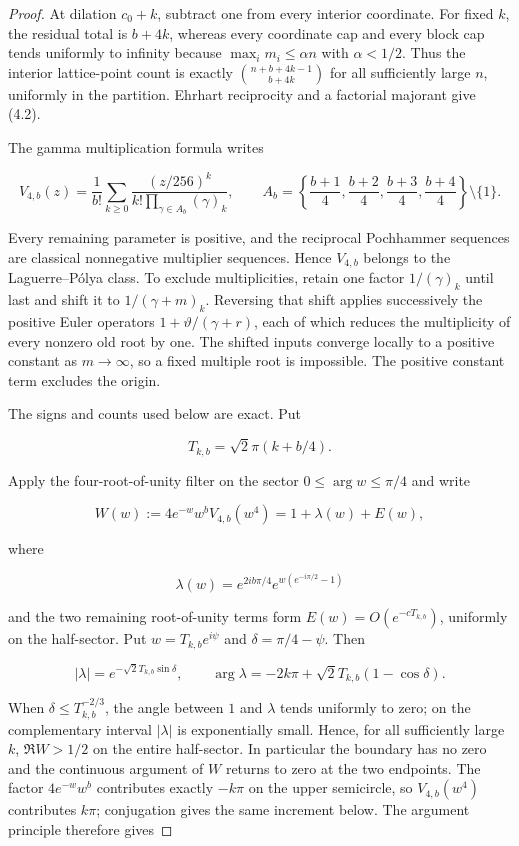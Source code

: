 \documentclass[11pt]{article}
\begin{document}
\begin{proof}


At dilation $c_0+k$, subtract one from every interior coordinate.  For fixed
$k$, the residual total is $b+4k$, whereas every coordinate cap and every
block cap tends uniformly to infinity because $\max_i m_i\le\alpha n$ with
$\alpha<1/2$.  Thus the interior lattice-point count is exactly
$\binom{n+b+4k-1}{b+4k}$ for all sufficiently large $n$, uniformly in the
partition.  Ehrhart reciprocity and a factorial majorant give (4.2).

The gamma multiplication formula writes

\[
V_{4,b}(z)=\frac1{b!}\sum_{k\ge0}
\frac{(z/256)^k}
{k!\prod_{\gamma\in A_b}(\gamma)_k},\qquad
A_b=\left\{\frac{b+1}4,\frac{b+2}4,\frac{b+3}4,\frac{b+4}4\right\}
\setminus\{1\}. \tag{4.3}
\]

Every remaining parameter is positive, and the reciprocal Pochhammer sequences
are classical nonnegative multiplier sequences.  Hence $V_{4,b}$ belongs to
the Laguerre--Pólya class.  To exclude multiplicities, retain one factor
$1/(\gamma)_k$ until last and shift it to $1/(\gamma+m)_k$.
Reversing that shift applies successively the positive Euler operators
$1+\vartheta/(\gamma+r)$, each of which reduces the multiplicity of every
nonzero old root by one.  The shifted inputs converge locally to a positive
constant as $m\to\infty$, so a fixed multiple root is impossible.  The
positive constant term excludes the origin.

The signs and counts used below are exact.  Put

\[
T_{k,b}=\sqrt2\pi(k+b/4).
\]

Apply the four-root-of-unity filter on the sector
$0\le\arg w\le\pi/4$ and write

\[
 W(w):=4e^{-w}w^bV_{4,b}(w^4)=1+\lambda(w)+E(w),
\]

where

\[
 \lambda(w)=e^{2ib\pi/4}e^{w(e^{-i\pi/2}-1)}
\]

and the two remaining root-of-unity terms form
$E(w)=O(e^{-cT_{k,b}})$, uniformly on the half-sector.  Put
$w=T_{k,b}e^{i\psi}$ and $\delta=\pi/4-\psi$.  Then

\[
 |\lambda|=e^{-\sqrt2T_{k,b}\sin\delta},\qquad
 \arg\lambda=-2k\pi+\sqrt2T_{k,b}(1-\cos\delta).
\]

When $\delta\le T_{k,b}^{-2/3}$, the angle between $1$ and
$\lambda$ tends uniformly to zero; on the complementary interval
$|\lambda|$ is exponentially small.  Hence, for all sufficiently large
$k$, $\Re W>1/2$ on the entire half-sector.  In particular the boundary
has no zero and the continuous argument of $W$ returns to zero at the two
endpoints.  The factor $4e^{-w}w^b$ contributes exactly $-k\pi$ on the
upper semicircle, so $V_{4,b}(w^4)$ contributes $k\pi$; conjugation gives
the same increment below.  The argument principle therefore gives


\end{proof}
\end{document}
